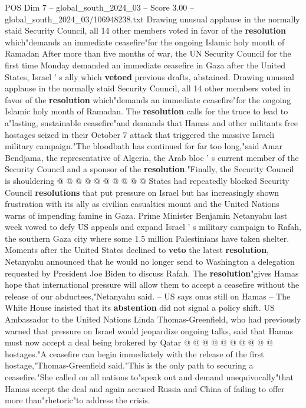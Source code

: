 \begin{textsample}{POS Dim 7 – global\_south\_2024\_03 – Score 3.00 – global\_south\_2024\_03/106948238.txt}  \label{ex:f7_pos_024}
Drawing unusual applause in the normally staid Security Council, all 14 other members voted in favor of the \textbf{resolution} which"demands an immediate ceasefire"for the ongoing Islamic holy month of Ramadan After more than five months of war, the UN Security Council for the first time Monday demanded an immediate ceasefire in Gaza after the United States, Israel ' s ally which \textbf{vetoed} previous drafts, abstained.
Drawing unusual applause in the normally staid Security Council, all 14 other members voted in favor of the \textbf{resolution} which"demands an immediate ceasefire"for the ongoing Islamic holy month of Ramadan.
The \textbf{resolution} calls for the truce to lead to a"lasting, sustainable ceasefire"and demands that Hamas and other militants free hostages seized in their October 7 attack that triggered the massive Israeli military campaign."The bloodbath has continued for far too long,"said Amar Bendjama, the representative of Algeria, the Arab bloc ' s current member of the Security Council and a sponsor of the \textbf{resolution}."Finally, the Security Council is shouldering @ @ @ @ @ @ @ @ @ @ States had repeatedly blocked Security Council \textbf{resolutions} that put pressure on Israel but has increasingly shown frustration with its ally as civilian casualties mount and the United Nations warns of impending famine in Gaza.
Prime Minister Benjamin Netanyahu last week vowed to defy US appeals and expand Israel ' s military campaign to Rafah, the southern Gaza city where some 1.5 million Palestinians have taken shelter.
Moments after the United States declined to \textbf{veto} the latest \textbf{resolution}, Netanyahu announced that he would no longer send to Washington a delegation requested by President Joe Biden to discuss Rafah.
The \textbf{resolution}"gives Hamas hope that international pressure will allow them to accept a ceasefire without the release of our abductees,"Netanyahu said. -- US says onus still on Hamas -- The White House insisted that its \textbf{abstention} did not signal a policy shift.
US Ambassador to the United Nations Linda Thomas-Greenfield, who had previously warned that pressure on Israel would jeopardize ongoing talks, said that Hamas must now accept a deal being brokered by Qatar @ @ @ @ @ @ @ @ @ @ hostages."A ceasefire can begin immediately with the release of the first hostage,"Thomas-Greenfield said."This is the only path to securing a ceasefire."She called on all nations to"speak out and demand unequivocally"that Hamas accept the deal and again accused Russia and China of failing to offer more than"rhetoric"to address the crisis.

\end{textsample}
